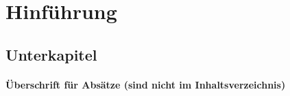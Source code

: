 \section{Hinführung}
\kant[1-2] 
\kant[3]
\kant[4-5]
\subsection{Unterkapitel}
\kant[6]
\paragraph{Überschrift für Absätze (sind nicht im Inhaltsverzeichnis)}
\kant[7]
